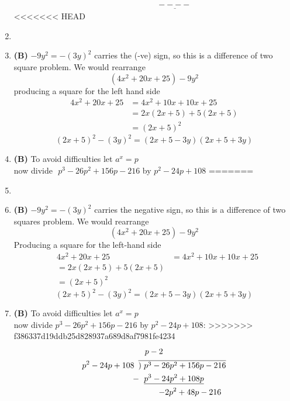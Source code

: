 \begin{multicols}{2}
\begin{enumerate}[label={\textbf{\arabic*.}}]
\begin{align*}
        & \hspace{51pt} \underline{----}
    \end{align*}
<<<<<<< HEAD
    \item
\item \textbf{(B)} $-9y^2 = -(3y)^2 $ carries the (-ve) sign, so this is a difference of two square problem. We would rearrange
    $$(4x^2 + 20x + 25) - 9y^2$$ 
    producing a square for the left hand side 
    \begin{align*}
    4x^2 + 20x + 25 &= 4x^2 + 10x  +10x + 25\\ &= 2x(2x + 5) + 5(2x+5)\\ &= (2x+5)^2
    \end{align*}
    $$(2x+5)^2 - (3y)^2 = (2x+ 5 - 3y)(2x + 5 + 3y)$$
    \item \textbf{(B)} To avoid difficulties let $a^x = p$ \\
    now divide\,\, $p^3 - 26p^2 + 156p - 216$ by $p^2 - 24p + 108$ 
=======
\item
\item \textbf{(B)} \( -9y^2 = -(3y)^2 \) carries the negative sign, so this is a difference of two squares problem. We would rearrange
        \[(4x^2 + 20x + 25) - 9y^2 \]
        Producing a square for the left-hand side
        \begin{align*}
        &4x^2 + 20x + 25 
        &= 4x^2 + 10x + 10x + 25 \\
        &= 2x(2x + 5) + 5(2x + 5) \\
        &= (2x + 5)^2
        \end{align*}
    \[(2x + 5)^2 - (3y)^2 = (2x + 5 - 3y)(2x + 5 + 3y) \] 
\item \textbf{(B)} To avoid difficulties let \( a^x = p \) \\
    now divide \( p^3 - 26p^2 + 156p - 216 \) by \( p^2 - 24p + 108 \):
>>>>>>> f386337d19ddb25d828937a689d8af7981fe4234
    \begin{align*} 
        & \hspace{8pt} p - 2 \\
        p^2 - 24p + 108 \hspace{5pt} & \overline{)\hspace{3pt} p^3 - 26p^2 + 156p - 216} \\
       -\hspace{-1pt} & \hspace{7pt} \underline{p^3 - 24p^2 + 108p} \\
       & \hspace{25pt} {-2p^2 + 48p - 216} \\

\end{align*}
\end{enumerate}
\end{multicols}
